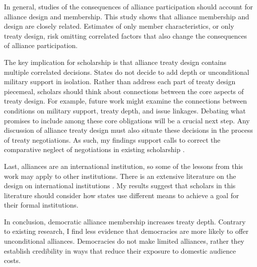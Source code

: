 \documentclass[12pt]{article}
\begin{document}
In general, studies of the consequences of alliance participation should account for alliance design and membership. 
This study shows that alliance membership and design are closely related. 
Estimates of only member characteristics, or only treaty design, risk omitting correlated factors that also change the consequences of alliance participation. 


The key implication for scholarship is that alliance treaty design contains multiple correlated decisions. 
States do not decide to add depth or unconditional military support in isolation. 
Rather than address each part of treaty design piecemeal, scholars should think about connections between the core aspects of treaty design. 
For example, future work might examine the connections between conditions on military support, treaty depth, and issue linkages.  
Debating what promises to include among these core obligations will be a crucial next step. 
Any discussion of alliance treaty design must also situate these decisions in the process of treaty negotiations.
As such, my findings support calls to correct the comparative neglect of negotiations in existing scholarship \citep{Poast2019a}. 


Last, alliances are an international institution, so some of the lessons from this work may apply to other institutions. 
There is an extensive literature on the design on international institutions \citep{DownesRocke1995, MartinSimmons1998, Koremenosetal2001, Koremenos2005, Thompson2010}.
My results suggest that scholars in this literature should consider how states use different means to achieve a goal for their formal institutions. 


In conclusion, democratic alliance membership increases treaty depth. 
Contrary to existing research, I find less evidence that democracies are more likely to offer unconditional alliances. 
Democracies do not make limited alliances, rather they establish credibility in ways that reduce their exposure to domestic audience costs. 



\singlespace
 
 
\end{document}
